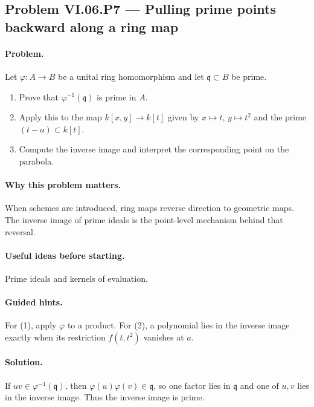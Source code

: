 \subsection*{Problem VI.06.P7 --- Pulling prime points backward along a ring map}
\label{prob:vi-06-p7}

\paragraph{Problem.}
Let \(\varphi:A\to B\) be a unital ring homomorphism and let \(\mathfrak q\subset B\) be
prime.
\begin{enumerate}
\item Prove that \(\varphi^{-1}(\mathfrak q)\) is prime in \(A\).
\item Apply this to the map \(k[x,y]\to k[t]\) given by \(x\mapsto t\), \(y\mapsto t^2\)
and the prime \((t-a)\subset k[t]\).
\item Compute the inverse image and interpret the corresponding point on the parabola.
\end{enumerate}

\ifdefined\FullProblemDossiers
\paragraph{Why this problem matters.}
When schemes are introduced, ring maps reverse direction to geometric maps.  The inverse
image of prime ideals is the point-level mechanism behind that reversal.

\paragraph{Useful ideas before starting.}
Prime ideals and kernels of evaluation.

\paragraph{Guided hints.}
For (1), apply \(\varphi\) to a product.  For (2), a polynomial lies in the inverse image
exactly when its restriction \(f(t,t^2)\) vanishes at \(a\).

\paragraph{Solution.}
If \(uv\in\varphi^{-1}(\mathfrak q)\), then
\(\varphi(u)\varphi(v)\in\mathfrak q\), so one factor lies in \(\mathfrak q\) and one of
\(u,v\) lies in the inverse image.  Thus the inverse image is prime.

